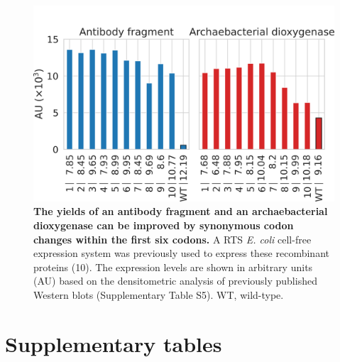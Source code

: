\begin{figure}[htbp!]
	\center
	\includegraphics[width=1\textwidth]{appendix/TIsigner/Figs/S14.png}
	\caption[The yields of an antibody fragment and an archaebacterial dioxygenase can be improved by synonymous codon changes within the first six codons.]{\textbf{The yields of an antibody fragment and an archaebacterial dioxygenase can be improved by synonymous codon changes within the first six codons.} A RTS \textit{E. coli} cell-free expression system was previously used to express these recombinant proteins (10). The expression levels are shown in arbitrary units (AU) based on the densitometric analysis of previously published Western blots (Supplementary Table S5). WT, wild-type.
	}
	\label{fig:appendix_TIsigner_S14}
\end{figure}

\clearpage

\section{Supplementary tables}



